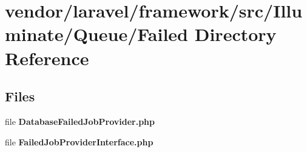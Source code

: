 \section{vendor/laravel/framework/src/\+Illuminate/\+Queue/\+Failed Directory Reference}
\label{dir_6fc0ddc03fd9a4ed6966ceff24273fc7}
\subsection*{Files}
\begin{DoxyCompactItemize}
\item 
file {\bf Database\+Failed\+Job\+Provider.\+php}
\item 
file {\bf Failed\+Job\+Provider\+Interface.\+php}
\end{DoxyCompactItemize}

